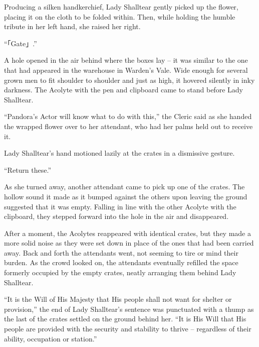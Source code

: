  

Producing a silken handkerchief, Lady Shalltear gently picked up the flower, placing it on the cloth to be folded within. Then, while holding the humble tribute in her left hand, she raised her right.

 

“「Gate」.”

 

A hole opened in the air behind where the boxes lay – it was similar to the one that had appeared in the warehouse in Warden’s Vale. Wide enough for several grown men to fit shoulder to shoulder and just as high, it hovered silently in inky darkness. The Acolyte with the pen and clipboard came to stand before Lady Shalltear.

 

“Pandora’s Actor will know what to do with this,” the Cleric said as she handed the wrapped flower over to her attendant, who had her palms held out to receive it.

 

Lady Shalltear’s hand motioned lazily at the crates in a dismissive gesture.

 

“Return these.”

 

As she turned away, another attendant came to pick up one of the crates. The hollow sound it made as it bumped against the others upon leaving the ground suggested that it was empty. Falling in line with the other Acolyte with the clipboard, they stepped forward into the hole in the air and disappeared.

 

After a moment, the Acolytes reappeared with identical crates, but they made a more solid noise as they were set down in place of the ones that had been carried away. Back and forth the attendants went, not seeming to tire or mind their burden. As the crowd looked on, the attendants eventually refilled the space formerly occupied by the empty crates, neatly arranging them behind Lady Shalltear.

 

“It is the Will of His Majesty that His people shall not want for shelter or provision,” the end of Lady Shalltear's sentence was punctuated with a thump as the last of the crates settled on the ground behind her. “It is His Will that His people are provided with the security and stability to thrive – regardless of their ability, occupation or station.”

